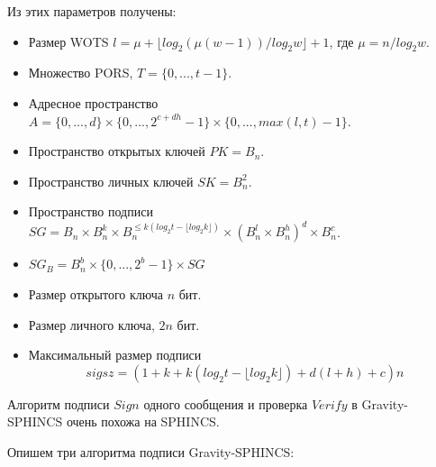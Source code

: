 \documentclass[a4paper, 14pt]{extarticle}
\begin{document}
Из этих параметров получены:

\begin{itemize}
    \item Размер WOTS $l = \mu + \lfloor log_{2}(\mu(w - 1))/log_{2}w \rfloor + 1$, где $\mu = n/log_{2}w$.
    \item Множество PORS, $T = \{0, ..., t - 1\}$.
    \item Адресное пространство $A = \{0, ..., d\} \times \{0, ..., 2^{c + dh} - 1\} \times \{0, ..., max(l,t) - 1\}$.
    \item Пространство открытых ключей $PK = B_{n}$.
    \item Пространство личных ключей $SK = B^{2}_{n}$.
    \item Пространство подписи $SG = B_{n} \times B^{k}_{n} \times B^{\leq k(log_{2}t - \lfloor log_{2}k \rfloor)}_{n} \times (B^{l}_{n} \times B^{h}_{n})^{d} \times B^{c}_{n}$.
    \item $SG_{B} = B^{b}_{n} \times \{0, ..., 2^{b} - 1\} \times SG$
    \item Размер открытого ключа $n$ бит.
    \item Размер личного ключа, $2n$ бит.
    \item Максимальный размер подписи
    \[sigsz = (1 + k +k(log_{2}t - \lfloor log_{2}k \rfloor) + d(l + h) + c)n\]
\end{itemize}

Алгоритм подписи $Sign$ одного сообщения и проверка $Verify$ в Gravity-SPHINCS очень похожа на SPHINCS.
\newline

Опишем три алгоритма подписи Gravity-SPHINCS:
\end{document}
